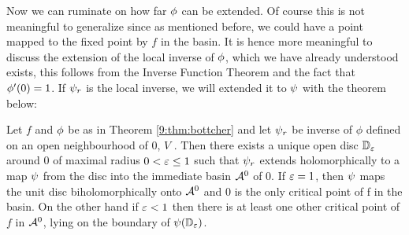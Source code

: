 \documentclass[../main.tex]{subfiles}
\begin{document}
Now we can ruminate on how far $\phi$ can be extended. Of course this is not meaningful to generalize since as mentioned before, we could have a point mapped to the fixed point by $f$ in the basin. It is hence more meaningful to discuss the extension of the local inverse of $\phi$, which we have already understood exists, this follows from the Inverse Function Theorem and the fact that $\phi'(0) = 1$. If $\psi_r$ is the local inverse, we will extended it to $\psi$ with the theorem below: 


\begin{thm}
\label{9:thm:extension}
Let $f$ and $\phi$ be as in Theorem \ref{9:thm:bottcher} and let $\psi_r$ be inverse of $\phi$ defined on an open neighbourhood of 0, $V$ . Then there exists a unique open disc $\mathbb{D}_{\varepsilon}$ around 0 of maximal radius $0<\varepsilon \leq 1$ such that $\psi_r$ extends holomorphically to a map $\psi$ from the disc into the immediate basin $\mathcal{A}^0$ of $0$. If $\varepsilon=1$, then $\psi$ maps the unit disc biholomorphically onto $\mathcal{A}^0$ and $0$ is the only critical point of f in the basin. On the other hand if $\varepsilon<1$ then there is at least one other critical point of $f$ in $\mathcal{A}^0$, lying on the boundary of $\psi(\mathbb{D}_{\varepsilon})$.
\end{thm}
\end{document}
